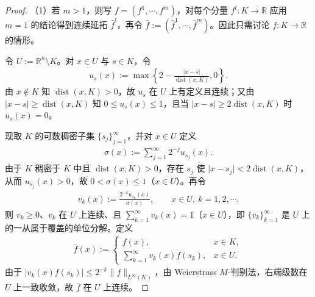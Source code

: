 \documentclass[../../main.tex]{subfiles}%
\begin{document}
\begin{proof}
（1）若 $m>1$，则写 $f=(f^1,\cdots,f^m)$，对每个分量 $f^l:K\to\mathbb{R}$ 应用 $m=1$ 的结论得到连续延拓 $\bar f^l$，再令 $\bar f:=(\bar f^1,\cdots,\bar f^m)$。因此只需讨论 $f:K\to\mathbb{R}$ 的情形。

令 $U:=\mathbb{R}^n\setminus K$。对 $x\in U$ 与 $s\in K$，令
\begin{align*}
u_s(x):=\max\left\{2-\frac{\lvert x-s\rvert}{\operatorname{dist}(x,K)},0\right\}.
\end{align*}
由 $x\notin K$ 知 $\operatorname{dist}(x,K)>0$，故 $u_s$ 在 $U$ 上有定义且连续；又由 $\lvert x-s\rvert\geqslant\operatorname{dist}(x,K)$ 知 $0\leqslant u_s(x)\leqslant 1$，且当 $\lvert x-s\rvert\geqslant 2\operatorname{dist}(x,K)$ 时 $u_s(x)=0$。

现取 $K$ 的可数稠密子集 $\{s_j\}_{j=1}^{\infty}$，并对 $x\in U$ 定义
\begin{align*}
\sigma(x):=\sum_{j=1}^{\infty}2^{-j}u_{s_j}(x).
\end{align*}
由于 $K$ 稠密于 $K$ 中且 $\operatorname{dist}(x,K)>0$，存在 $s_j$ 使 $\lvert x-s_j\rvert<2\operatorname{dist}(x,K)$，从而 $u_{s_j}(x)>0$，故 $0<\sigma(x)\leqslant 1$（$x\in U$）。再令
\begin{align*}
v_k(x):=\frac{2^{-k}u_{s_k}(x)}{\sigma(x)},\qquad x\in U,\ k=1,2,\cdots.
\end{align*}
则 $v_k\geqslant0$、$v_k$ 在 $U$ 上连续、且 $\sum_{k=1}^{\infty}v_k(x)=1$（$x\in U$），即 $\{v_k\}_{k=1}^{\infty}$ 是 $U$ 上的一从属于覆盖的单位分解。定义
\begin{align*}
\bar f(x):=
\begin{cases}
f(x), & x\in K,\\[2pt]
\displaystyle\sum_{k=1}^{\infty}v_k(x)f(s_k), & x\in U.
\end{cases}
\end{align*}
由于 $\lvert v_k(x)f(s_k)\rvert\leqslant 2^{-k}\lVert f\rVert_{L^{\infty}(K)}$，由 Weierstrass $M$-判别法，右端级数在 $U$ 上一致收敛，故 $\bar f$ 在 $U$ 上连续。


\end{proof}
\end{document}
